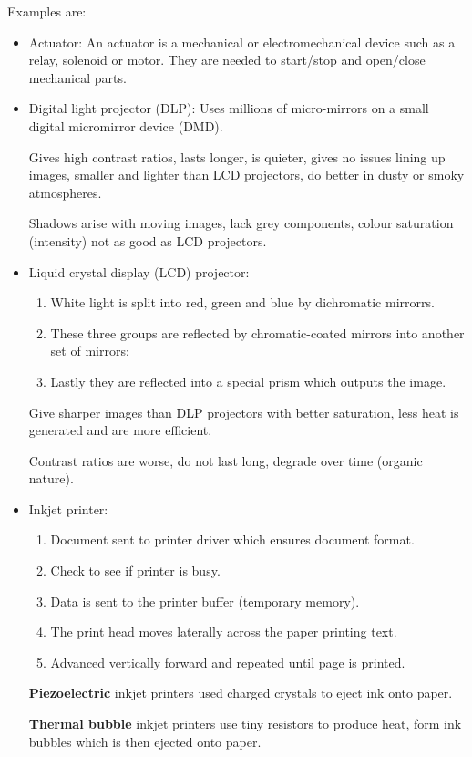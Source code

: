 \documentclass{article}
\begin{document}
Examples are:
\begin{itemize}
	\item Actuator: An actuator is a mechanical or electromechanical device such as a 
		relay, solenoid or motor. They are needed to start/stop and open/close mechanical
		parts.
	\item Digital light projector (DLP): Uses millions of micro-mirrors on a small digital
		micromirror device (DMD). 

		Gives high contrast ratios, lasts longer, is quieter,
		gives no issues lining up images, smaller and lighter than LCD projectors, do better
		in dusty or smoky atmospheres.

		Shadows arise with moving images, lack grey components, colour saturation 
		(intensity) not as good as LCD projectors.
	\item Liquid crystal display (LCD) projector: 
		\begin{enumerate}
			\item White light is split into red, green and blue by dichromatic mirrorrs.
			\item These three groups are reflected by chromatic-coated mirrors into another
				set of mirrors;
			\item Lastly they are reflected into a special prism which outputs the image.
		\end{enumerate}

		Give sharper images than DLP projectors with better saturation, less heat 
		is generated and are more efficient.

		Contrast ratios are worse, do not last long, degrade over time (organic nature).
	\item Inkjet printer:
		\begin{enumerate}
			\item Document sent to printer driver which ensures document format.
			\item Check to see if printer is busy.
			\item Data is sent to the printer buffer (temporary memory).
			\item The print head moves laterally across the paper printing text.
			\item Advanced vertically forward and repeated until page is printed.
		\end{enumerate}

		\textbf{Piezoelectric} inkjet printers used charged crystals to eject ink onto 
		paper.
		
		\textbf{Thermal bubble} inkjet printers use tiny resistors to produce heat, form 
		ink bubbles which is then ejected onto paper.


\end{itemize}
\end{document}
